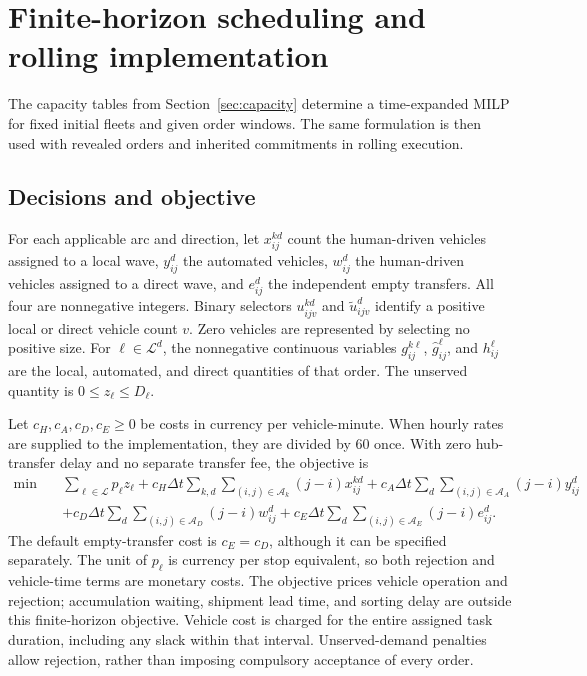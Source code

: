 \section{Finite-horizon scheduling and rolling implementation}
\label{sec:model}

The capacity tables from Section~\ref{sec:capacity} determine a time-expanded
MILP for fixed initial fleets and given order windows. The same formulation
is then used with revealed orders and inherited commitments in rolling execution.

\subsection{Decisions and objective}

For each applicable arc and direction, let $x_{ij}^{kd}$ count the human-driven
vehicles assigned to a local wave, $y_{ij}^d$ the automated vehicles,
$w_{ij}^d$ the human-driven vehicles assigned to a direct wave, and
$e_{ij}^d$ the independent empty transfers. All four are nonnegative integers. Binary selectors
$u_{ijv}^{kd}$ and $\widetilde u_{ijv}^d$ identify a positive local or
direct vehicle count $v$. Zero vehicles are represented by selecting no positive
size. For $\ell\in\mathcal L^d$, the nonnegative continuous variables
$g_{ij}^{k\ell}$, $\widehat g_{ij}^{\ell}$, and $h_{ij}^{\ell}$ are the
local, automated, and direct quantities of that order. The unserved quantity
is $0\leq z_\ell\leq D_\ell$.

Let $c_H,c_A,c_D,c_E\geq0$ be costs in currency per vehicle-minute.
When hourly rates are supplied to the implementation, they are divided by
$60$ once. With zero hub-transfer delay and no separate transfer fee, the
objective is
\begin{align}
 \min\quad &\sum_{\ell\in\mathcal L}p_\ell z_\ell
 +c_H\Delta t\sum_{k,d}\sum_{(i,j)\in\mathcal A_k}(j-i)x_{ij}^{kd}
 +c_A\Delta t\sum_d\sum_{(i,j)\in\mathcal A_A}(j-i)y_{ij}^d
 \nonumber\\
 &+c_D\Delta t\sum_d\sum_{(i,j)\in\mathcal A_D}(j-i)w_{ij}^d
 +c_E\Delta t\sum_d\sum_{(i,j)\in\mathcal A_E}(j-i)e_{ij}^d.
 \label{mod:objective}
\end{align}
The default empty-transfer cost is $c_E=c_D$, although it can be specified
separately. The unit of $p_\ell$ is currency per stop equivalent, so
both rejection and vehicle-time terms are monetary costs. The objective
prices vehicle operation and rejection; accumulation waiting, shipment
lead time, and sorting delay are outside this finite-horizon objective.
Vehicle cost is charged for the entire assigned task duration,
including any slack within that interval. Unserved-demand penalties allow
rejection, rather than imposing compulsory acceptance of every order.

